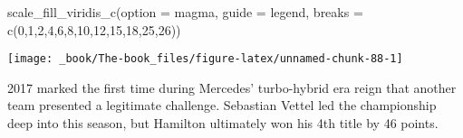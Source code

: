 \documentclass[
]{book}
\newenvironment{Shaded}{\begin{snugshade}}{\end{snugshade}}
\newcommand{\AttributeTok}[1]{\textcolor[rgb]{0.77,0.63,0.00}{#1}}
\newcommand{\DecValTok}[1]{\textcolor[rgb]{0.00,0.00,0.81}{#1}}
\newcommand{\FunctionTok}[1]{\textcolor[rgb]{0.00,0.00,0.00}{#1}}
\newcommand{\NormalTok}[1]{#1}
\newcommand{\StringTok}[1]{\textcolor[rgb]{0.31,0.60,0.02}{#1}}
\begin{document}
\begin{Shaded}
\begin{Highlighting}[]
  \FunctionTok{scale\_fill\_viridis\_c}\NormalTok{(}\AttributeTok{option =} \StringTok{\textquotesingle{}magma\textquotesingle{}}\NormalTok{,}
                       \AttributeTok{guide =} \StringTok{\textquotesingle{}legend\textquotesingle{}}\NormalTok{,}
                       \AttributeTok{breaks =} \FunctionTok{c}\NormalTok{(}\DecValTok{0}\NormalTok{,}\DecValTok{1}\NormalTok{,}\DecValTok{2}\NormalTok{,}\DecValTok{4}\NormalTok{,}\DecValTok{6}\NormalTok{,}\DecValTok{8}\NormalTok{,}\DecValTok{10}\NormalTok{,}\DecValTok{12}\NormalTok{,}\DecValTok{15}\NormalTok{,}\DecValTok{18}\NormalTok{,}\DecValTok{25}\NormalTok{,}\DecValTok{26}\NormalTok{))}
\end{Highlighting}
\end{Shaded}

\begin{center}\texttt{[image: \_book/The-book\_files/figure-latex/unnamed-chunk-88-1]} \end{center}

2017 marked the first time during Mercedes' turbo-hybrid era reign that another team presented a legitimate challenge. Sebastian Vettel led the championship deep into this season, but Hamilton ultimately won his 4th title by 46 points.
\end{document}
